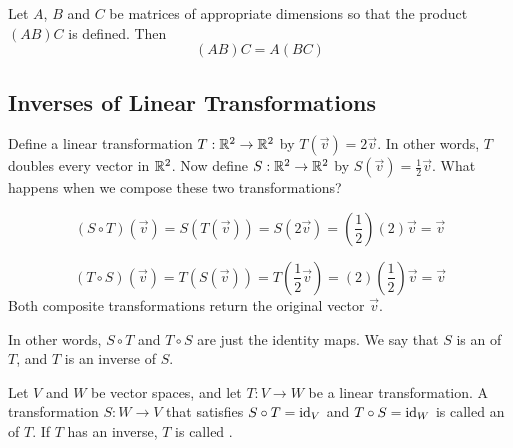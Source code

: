 \documentclass{ximera}
\begin{document}
\begin{theorem} \label{th:associativematrixmult}  Let $A$, $B$ and $C$ be matrices of appropriate dimensions so that the product $(AB)C$ is defined.  Then
$$(AB)C=A(BC)$$
\end{theorem}

 
\subsection*{Inverses of Linear Transformations}

 
\begin{exploration}\label{ep:inverse} Define a linear transformation $T:\mathbb{R}^2\rightarrow \mathbb{R}^2$ by $T(\vec{v})=2\vec{v}$.  In other words, $T$ doubles every vector in $\mathbb{R}^2$.  Now define $S:\mathbb{R}^2\rightarrow \mathbb{R}^2$ by $S(\vec{v})=\frac{1}{2}\vec{v}$.  What happens when we compose these two transformations?

$$(S\circ T)(\vec{v})=S(T(\vec{v}))=S(2\vec{v})=\left(\frac{1}{2}\right)(2)\vec{v}=\vec{v}$$

$$(T\circ S)(\vec{v})=T(S(\vec{v}))=T(\frac{1}{2}\vec{v})=(2)\left(\frac{1}{2}\right)\vec{v}=\vec{v}$$
Both composite transformations return the original vector $\vec{v}$. 

In other words, $S\circ T$ and $T\circ S$ are just the identity maps.  We say that $S$ is an  of $T$, and $T$ is an inverse of $S$.
\end{exploration}



 
\begin{definition}\label{def:inverseoflintrans} Let $V$ and $W$ be vector spaces, and let $T:V\rightarrow W$ be a linear transformation.  A transformation $S:W\rightarrow V$ that satisfies $S\circ T=\text{id}_V$ and $T\circ S=\text{id}_W$ is called an  of $T$. If $T$ has an inverse, $T$ is called .
\end{definition}
 
\end{document}
